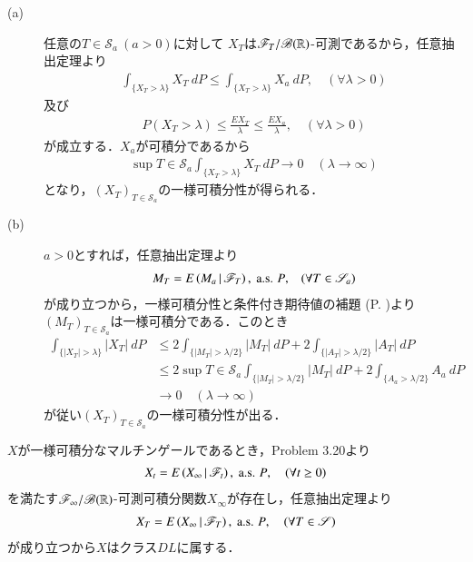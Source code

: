 	\begin{prf}\mbox{}
		\begin{description}
			\item[(a)]
				任意の$T \in \mathscr{S}_a\ (a > 0)$に対して
				$X_T$は$\mathscr{F}_T/\mathscr{B}(\mathbb{R})$-可測であるから，任意抽出定理より
				\begin{align}
					\int_{\{X_T > \lambda\}} X_T\ dP
					\leq \int_{\{X_T > \lambda\}} X_a\ dP,
					\quad (\forall \lambda > 0)
				\end{align}
				及び
				\begin{align}
					P\left( X_T > \lambda \right)
					\leq \frac{EX_T}{\lambda}
					\leq \frac{EX_a}{\lambda},
					\quad (\forall \lambda > 0)
				\end{align}
				が成立する．$X_a$が可積分であるから
				\begin{align}
					\sup{T \in \mathscr{S}_a}{\int_{\{X_T > \lambda\}} X_T\ dP}
					\longrightarrow 0
					\quad (\lambda \longrightarrow \infty)
				\end{align}
				となり，$(X_T)_{T \in \mathscr{S}_a}$の一様可積分性が得られる．
				
			\item[(b)]
				$a > 0$とすれば，任意抽出定理より
				\begin{align}
					M_T = E\left( M_a \, \middle|\, \mathscr{F}_T \right),\ \mbox{a.s. $P$,}
					\quad (\forall T \in \mathscr{S}_a)
				\end{align}
				が成り立つから，一様可積分性と条件付き期待値の補題
				(P. \pageref{lem:uniformly_integrability_and_conditional_expectations})より
				$(M_T)_{T \in \mathscr{S}_a}$は一様可積分である．このとき
				\begin{align}
					\int_{\{|X_T| > \lambda\}} |X_T|\ dP
					&\leq 2\int_{\{|M_T| > \lambda/2\}} |M_T|\ dP + 2\int_{\{|A_T| > \lambda/2\}} |A_T|\ dP \\
					&\leq 2\sup{T \in \mathscr{S}_a}{\int_{\{|M_T| > \lambda/2\}} |M_T|\ dP} + 2\int_{\{A_a > \lambda/2\}} A_a\ dP \\
					&\longrightarrow 0 \quad (\lambda \longrightarrow \infty)
				\end{align}
				が従い$(X_T)_{T \in \mathscr{S}_a}$の一様可積分性が出る．
		\end{description}
		$X$が一様可積分なマルチンゲールであるとき，Problem 3.20より
		\begin{align}
			X_t = E\left( X_\infty \, \middle|\, \mathscr{F}_t \right),\ \mbox{a.s. $P$},
			\quad (\forall t \geq 0)
		\end{align}
		を満たす$\mathscr{F}_\infty/\mathscr{B}(\mathbb{R})$-可測可積分関数$X_\infty$が存在し，任意抽出定理より
		\begin{align}
			X_T = E\left( X_\infty \, \middle|\, \mathscr{F}_T \right),\ \mbox{a.s. $P$},
			\quad (\forall T \in \mathscr{S})
		\end{align}
		が成り立つから$X$はクラス$DL$に属する．
		\QED
	\end{prf}
	
